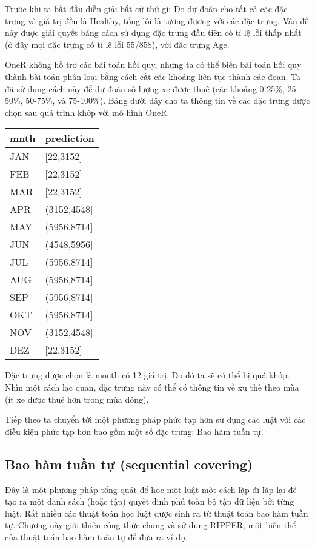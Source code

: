 Trước khi ta bắt đầu diễn giải bất cứ thứ gì: Do dự đoán cho tất cả các đặc trưng và giá trị đều là Healthy, tổng lỗi là tương đương với các đặc trưng. Vấn đề này được giải quyết bằng cách sử dụng đặc trưng đầu tiên có tỉ lệ lỗi thấp nhất (ở đây mọi đặc trưng có tỉ lệ lỗi 55/858), với đặc trưng Age.

OneR không hỗ trợ các bài toán hồi quy, nhưng ta có thể biến bài toán hồi quy thành bài toán phân loại bằng cách cắt các khoảng liên tục thành các đoạn. Ta đã sử dụng cách này để dự đoán số lượng xe được thuê (các khoảng 0-25\%, 25-50\%, 50-75\%, và 75-100\%). Bảng dưới đây cho ta thông tin về các đặc trưng được chọn sau quá trình khớp với mô hình OneR.

\begin{table*}[hbt!]
\centering
\begin{tabular}{|l|l|}
\hline
\textbf{mnth} & \textbf{prediction} \\ \hline
JAN           & {[}22,3152{]}       \\ \hline
FEB           & {[}22,3152{]}       \\ \hline
MAR           & {[}22,3152{]}       \\ \hline
APR           & (3152,4548{]}       \\ \hline
MAY           & (5956,8714{]}       \\ \hline
JUN           & (4548,5956{]}       \\ \hline
JUL           & (5956,8714{]}       \\ \hline
AUG           & (5956,8714{]}       \\ \hline
SEP           & (5956,8714{]}       \\ \hline
OKT           & (5956,8714{]}       \\ \hline
NOV           & (3152,4548{]}       \\ \hline
DEZ           & {[}22,3152{]}       \\ \hline
\end{tabular}
\end{table*}

Đặc trưng được chọn là month có 12 giá trị. Do đó ta sẽ có thể bị quá khớp. Nhìn một cách lạc quan, đặc trưng này có thể có thông tin về xu thế theo mùa (ít xe được thuê hơn trong mùa đông).

Tiếp theo ta chuyển tới một phương pháp phức tạp hơn sử dụng các luật với các điều kiện phức tạp hơn bao gồm một số đặc trưng: Bao hàm tuần tự.

\subsection{Bao hàm tuần tự (sequential covering)}
Đây là một phương pháp tổng quát để học một luật một cách lặp đi lặp lại để tạo ra một danh sách (hoặc tập) quyết định phủ toàn bộ tập dữ liệu bởi từng luật. Rất nhiều các thuật toán học luật được sinh ra từ thuật toán bao hàm tuần tự. Chương này giới thiệu công thức chung và sử dụng RIPPER, một biến thể của thuật toán bao hàm tuần tự để đưa ra ví dụ.

